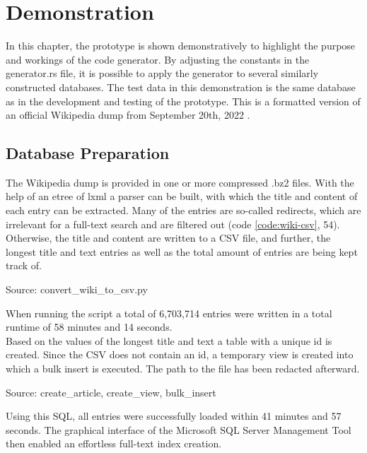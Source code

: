 \newpage
\section{Demonstration}
In this chapter, the prototype is shown demonstratively to highlight the purpose and workings of the code generator. By adjusting the constants in the generator.rs file, it is possible to apply the generator to several similarly constructed databases. The test data in this demonstration is the same database as in the development and testing of the prototype. This is a formatted version of an official Wikipedia dump from September 20th, 2022 \parencite[see][n.p.]{wikimedia_enwiki_2022}.
\subsection{Database Preparation}
The Wikipedia dump is provided in one or more compressed .bz2 files. With the help of an etree of lxml a parser can be built, with which the title and content of each entry can be extracted. Many of the entries are so-called redirects, which are irrelevant for a full-text search and are filtered out (code \ref{code:wiki-csv}, 54). Otherwise, the title and content are written to a CSV file, and further, the longest title and text entries as well as the total amount of entries are being kept track of.
\begin{codeenv}
    \label{code:wiki-csv}
    
    \centerline{Source: convert\_wiki\_to\_csv.py}
\end{codeenv}
When running the script a total of 6,703,714 entries were written in a total runtime of 58 minutes and 14 seconds.\\
Based on the values of the longest title and text a table with a unique id is created. Since the CSV does not contain an id, a temporary view is created into which a bulk insert is executed. The path to the file has been redacted afterward.
\begin{codeenv}
    \label{code:wiki-sql}
    
    
    
    \centerline{Source: create\_article, create\_view, bulk\_insert}
\end{codeenv}
Using this \ac{SQL}, all entries were successfully loaded within 41 minutes and 57 seconds. The graphical interface of the Microsoft SQL Server Management Tool then enabled an effortless full-text index creation.

